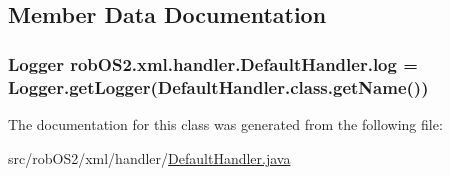 \subsection{Member Data Documentation}
\hypertarget{classrob_o_s2_1_1xml_1_1handler_1_1_default_handler_a6d4e2297133a5328a472ad2ca6163c51}{
\subsubsection[{log}]{\setlength{\rightskip}{0pt plus 5cm}Logger {\bf robOS2.xml.handler.DefaultHandler.log} = Logger.getLogger(DefaultHandler.class.getName())}}
\label{classrob_o_s2_1_1xml_1_1handler_1_1_default_handler_a6d4e2297133a5328a472ad2ca6163c51}


The documentation for this class was generated from the following file:\begin{DoxyCompactItemize}
\item 
src/robOS2/xml/handler/\hyperlink{_default_handler_8java}{DefaultHandler.java}\end{DoxyCompactItemize}
